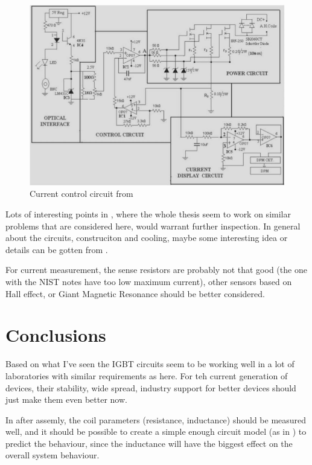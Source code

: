 \documentclass[12pt,a4paper]{article}
\begin{document}
\begin{figure}[ht!]
\centering
\includegraphics[width=130mm]{mosfetcircuit.png}
\caption{Current control circuit from \citet{Pant2011}}
\label{fig:mosfet}
\end{figure}

Lots of interesting points in \citet{Gorelik2002}, where the whole thesis seem to work on similar problems that are considered here, would warrant further inspection. In general about the circuits, construciton and cooling, maybe some interesting idea or details can be gotten from \citet{Meyrath2004}.

For current measurement, the sense resistors are probably not that good (the one with the NIST notes have too low maximum current), other sensors based on Hall effect, or Giant Magnetic Resonance should be better considered.

\section{Conclusions}

Based on what I've seen the IGBT circuits seem to be working well in a lot of laboratories with similar requirements as here. For teh current generation of devices, their stability, wide spread, industry support for better devices should just make them even better now.

In after assemly, the coil parameters (resistance, inductance) should be measured well, and it should be possible to create a simple enough circuit model (as in \citet{Deissler2003}) to predict the behaviour, since the inductance will have the biggest effect on the overall system behaviour.
\end{document}
